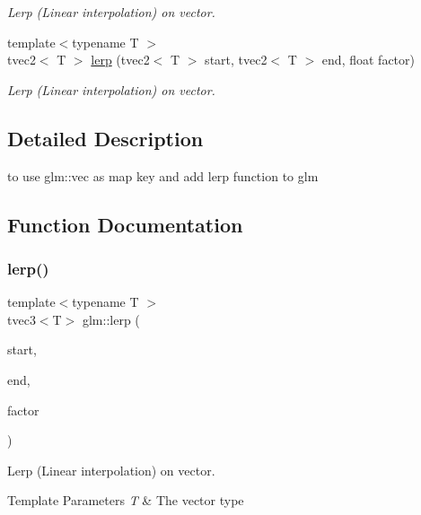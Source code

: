 \begin{DoxyCompactItemize}
\begin{DoxyCompactList}\small\item\em Lerp (Linear interpolation) on vector. \end{DoxyCompactList}\item 
{\footnotesize template$<$typename T $>$ }\\tvec2$<$ T $>$ \hyperlink{namespaceglm_a79e735a5bc6da50814842eea2ff08afa}{lerp} (tvec2$<$ T $>$ start, tvec2$<$ T $>$ end, float factor)
\begin{DoxyCompactList}\small\item\em Lerp (Linear interpolation) on vector. \end{DoxyCompactList}\end{DoxyCompactItemize}


\subsection{Detailed Description}
to use glm\+::vec as map key and add lerp function to glm 

\subsection{Function Documentation}
\mbox{\label{namespaceglm_a83419436f77956f1d0f81fd54a5a5868}} 
\subsubsection{\texorpdfstring{lerp()}{lerp()}\hspace{0.1cm}{\footnotesize\ttfamily [1/2]}}
{\footnotesize\ttfamily template$<$typename T $>$ \\
tvec3$<$T$>$ glm\+::lerp (\begin{DoxyParamCaption}\item[{tvec3$<$ T $>$}]{start,  }\item[{tvec3$<$ T $>$}]{end,  }\item[{float}]{factor }\end{DoxyParamCaption})}



Lerp (Linear interpolation) on vector. 


\begin{DoxyTemplParams}{Template Parameters}
{\em T} & The vector type \\
\hline
\end{DoxyTemplParams}

